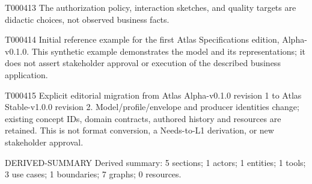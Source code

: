 \documentclass[11pt,a4paper]{article}
\begin{document}
\begin{atlasparagraph}{T000413}
The authorization policy, interaction sketches, and quality targets are didactic choices, not observed business facts.
\end{atlasparagraph}
\begin{atlasparagraph}{T000414}
Initial reference example for the first Atlas Specifications edition, Alpha-v0.1.0. This synthetic example demonstrates the model and its representations; it does not assert stakeholder approval or execution of the described business application.
\end{atlasparagraph}
\begin{atlasparagraph}{T000415}
Explicit editorial migration from Atlas Alpha-v0.1.0 revision 1 to Atlas Stable-v1.0.0 revision 2. Model/profile/envelope and producer identities change; existing concept IDs, domain contracts, authored history and resources are retained. This is not format conversion, a Needs-to-L1 derivation, or new stakeholder approval.
\end{atlasparagraph}
\begin{atlasderived}{DERIVED-SUMMARY}
Derived summary: 5 sections; 1 actors; 1 entities; 1 tools; 3 use cases; 1 boundaries; 7 graphs; 0 resources.
\end{atlasderived}
%
\end{document}
